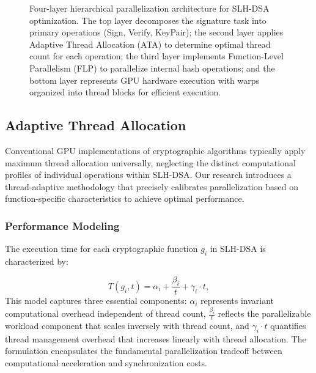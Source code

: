 \documentclass[journal]{IEEEtran}
\begin{document}
\begin{figure*}[htbp]
  \caption{Four-layer hierarchical parallelization architecture for SLH-DSA optimization. The top layer decomposes the signature task into primary operations (Sign, Verify, KeyPair); the second layer applies Adaptive Thread Allocation (ATA) to determine optimal thread count for each operation; the third layer implements Function-Level Parallelism (FLP) to parallelize internal hash operations; and the bottom layer represents GPU hardware execution with warps organized into thread blocks for efficient execution.}
  \label{fig:optimization_architecture}
\end{figure*}

\subsection{Adaptive Thread Allocation}

Conventional GPU implementations of cryptographic algorithms typically apply maximum thread allocation universally, neglecting the distinct computational profiles of individual operations within SLH-DSA. Our research introduces a thread-adaptive methodology that precisely calibrates parallelization based on function-specific characteristics to achieve optimal performance.

\subsubsection{Performance Modeling}

The execution time for each cryptographic function $g_i$ in SLH-DSA is characterized by:

\begin{equation}
  \label{eq:execution_time_model}
  T(g_i, t) = \alpha_i + \frac{\beta_i}{t} + \gamma_i \cdot t,
\end{equation}
This model captures three essential components: $\alpha_i$ represents invariant computational overhead independent of thread count, $\frac{\beta_i}{t}$ reflects the parallelizable workload component that scales inversely with thread count, and $\gamma_i \cdot t$ quantifies thread management overhead that increases linearly with thread allocation. The formulation encapsulates the fundamental parallelization tradeoff between computational acceleration and synchronization costs.
\end{document}
